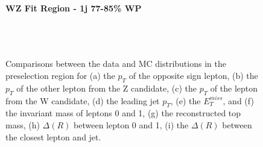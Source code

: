 \begin{figure}[H] 
    \centering
    \textbf{WZ Fit Region - 1j 77-85\% WP}\\
    \\
    \\
    \\
    \caption{Comparisons between the data and MC distributions in the preselection region for (a) the $p_T$ of the opposite sign lepton, (b) the $p_T$ of the other lepton from the Z candidate, (c) the $p_T$ of the lepton from the W candidate, (d) the leading jet $p_T$, (e) the $E_T^{miss}$, and (f) the invariant mass of leptons 0 and 1, (g) the reconstructed top mass, (h) $\Delta(R)$  between lepton 0 and 1, (i) the $\Delta(R)$ between the closest lepton and jet.}
    \label{kin:WP_1j_77_85}
\end{figure}

